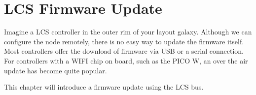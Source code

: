 \chapter{LCS Firmware Update}

Imagine a LCS controller in the outer rim of your layout galaxy. Although we can configure the node remotely, there is no easy way to update the firmware itself. Most controllers offer the download of firmware via USB or a serial connection. For controllers with a WIFI chip on board, such as the PICO W, an over the air update has become quite popular. 

This chapter will introduce a firmware update using the LCS bus. 